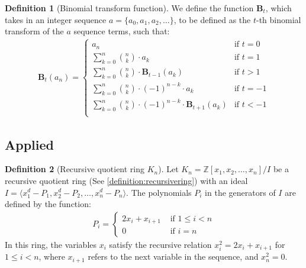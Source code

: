 \documentclass{article}
\theoremstyle{plain}
\theoremstyle{definition}
\newtheorem{definition}{Definition}
\newcommand{\Z}{\mathbb{Z}}
\newcommand{\K}{K}
\newcommand{\BT}{\textbf{B}}
\begin{document}
\begin{definition}[Binomial transform function] \label{definition:binomialtransforms}
We define the function $\BT_t$, which takes in an integer sequence $a = \{ a_0, a_1, a_2, \ldots \}$, to be defined as the $t$-th binomial transform of the $a$ sequence terms, such that:
\begin{align*}
    \BT_{t}(a_n) =
    \begin{cases}
        a_n &\text{if } t = 0 \\
        \sum_{k=0}^{n} \binom{n}{k} \cdot a_k &\text{if } t = 1 \\
        \sum_{k=0}^{n} \binom{n}{k} \cdot \BT_{t-1}(a_k) &\text{if } t > 1 \\
        \sum_{k=0}^{n} \binom{n}{k} \cdot (-1)^{n-k} \cdot a_k  &\text{if } t = -1 \\
        \sum_{k=0}^{n} \binom{n}{k} \cdot (-1)^{n-k} \cdot \BT_{t+1}(a_k) &\text{if } t < -1 \\
    \end{cases}
\end{align*}
\end{definition}

\subsection{Applied}

\begin{definition}[Recursive quotient ring $\K_n$] \label{definition:ring}
Let $\K_n = \Z[x_1, x_2, \ldots, x_n]/I$ be a recursive quotient ring (See \cref{definition:recursivering}) with an ideal \( I = \langle x_1^d - P_1, x_2^d - P_2, \ldots, x_n^d - P_n \rangle \). The polynomials $P_i$ in the generators of $I$ are defined by the function: 
\begin{align}
P_i =
\begin{cases}
    2x_i + x_{i+1} & \text{ if } 1 \leq i < n \\
    0 &\text{ if } i = n
\end{cases}
\end{align}
In this ring, the variables $x_i$ satisfy the recursive relation $x_i^2 = 2x_i + x_{i+1}$ for $1 \leq i < n$, where $x_{i+1}$ refers to the next variable in the sequence, and $x_n^2 = 0$.
\end{definition}
\end{document}
